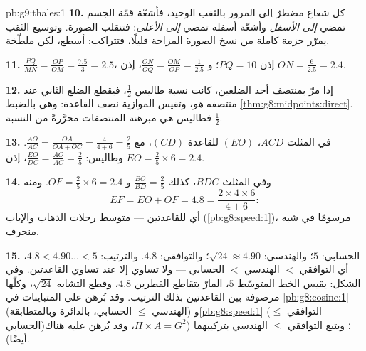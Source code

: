 \begin{solution}{pb:g9:thales:1}
\textbf{10.} كل شعاع مضطرّ إلى المرور بالثقب الوحيد، فأشعّة قمّة
الجسم تمضي \emph{إلى الأسفل} وأشعّة أسفله تمضي \emph{إلى
الأعلى}: فتنقلب الصورة. وتوسيع الثقب يمرّر حزمة كاملة من نسخ
الصورة المزاحة قليلًا، فتتراكب: أسطع، لكن ملطّخة.

\textbf{11.} $\frac{PQ}{MN} = \frac{OP}{OM} = \frac{7.5}{3}
= 2.5$، إذن $PQ = 10$؛ و $\frac{ON}{OQ} = \frac{OM}{OP} =
\frac{1}{2.5}$، إذن $ON = \frac{6}{2.5} = 2.4$.

\textbf{12.} إذا مرّ  بمنتصف أحد الضلعين، كانت نسبة طاليس
$\frac12$، فيقطع الضلع الثاني عند منتصفه \emph{هو}، وتقيس
 الموازية نصف القاعدة: وهي بالضبط
\cref{thm:g8:midpoints:direct}. فطاليس هي مبرهنة المنتصفات
محرَّرةً من النسبة $\frac12$.

\textbf{13.} في المثلث $ACD$،  $(EO)$  للقاعدة
$(CD)$، مع $\frac{AO}{AC} = \frac{OA}{OA + OC} =
\frac{4}{4 + 6} = \frac25$. وطاليس:
$\frac{EO}{DC} = \frac{AO}{AC} = \frac25$، إذن
$EO = \frac25 \times 6 = 2.4$.

\textbf{14.} وفي المثلث $BDC$، كذلك
$\frac{BO}{BD} = \frac25$ و $OF = \frac25 \times 6 = 2.4$.
ومنه
\[
EF = EO + OF = 4.8
= \frac{2 \times 4 \times 6}{4 + 6} :
\]
أي  للقاعدتين --- متوسط رحلات الذهاب والإياب
(\cref{pb:g8:speed:1})، مرسومًا في شبه منحرف.

\textbf{15.} الحسابي: $5$؛ والهندسي:
$\sqrt{24} \approx 4.90$؛ والتوافقي: $4.8$. والترتيب:
$4.8 < 4.90\ldots < 5$، أي التوافقي $<$ الهندسي $<$
الحسابي --- ولا تساوي إلا عند تساوي القاعدتين. وفي الشكل: يقيس
الخط المتوسّط $5$،  المارّ بتقاطع القطرين $4.8$، وقطع
التشابه $\sqrt{24}$، وكلّها مرصوفة بين القاعدتين بذلك الترتيب.
وقد بُرهن على المتباينات في \cref{pb:g8:cosine:1} (الهندسي
$\leq$ الحسابي، بالدائرة وبالمتطابقة) و\cref{pb:g8:speed:1}
(التوافقي $\leq$ الحسابي)؛ ويتبع التوافقي $\leq$ الهندسي
بتركيبهما ($H \times A = G^2$، وقد بُرهن عليه هناك أيضًا).
\end{solution}
